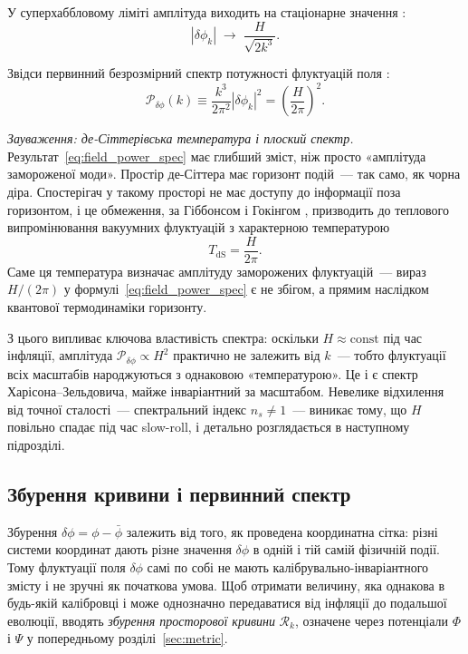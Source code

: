 \documentclass[12pt, a4paper]{article}
\begin{document}
У суперхаббловому ліміті амплітуда виходить на стаціонарне
значення \cite{guth_pi_1982}:
\begin{equation*}
  |\delta\phi_k| \;\to\; \frac{H}{\sqrt{2k^3}}.
\end{equation*}

Звідси первинний безрозмірний спектр потужності флуктуацій поля
\cite{mukhanov_chibisov_1981}:
\begin{equation}\label{eq:field_power_spec}
  \mathcal{P}_{\delta\phi}(k)
    \equiv \frac{k^3}{2\pi^2}|\delta\phi_k|^2
    = \left(\frac{H}{2\pi}\right)^{\!2}.
\end{equation}

\textit{Зауваження: де-Сіттерівська температура і плоский спектр.}
Результат~\eqref{eq:field_power_spec} має глибший зміст, ніж
просто «амплітуда замороженої моди». Простір де-Сіттера має
горизонт подій~--- так само, як чорна діра. Спостерігач у такому
просторі не має доступу до інформації поза горизонтом, і це
обмеження, за Гіббонсом і Гокінгом \cite{gibbons_hawking_1977},
призводить до теплового випромінювання вакуумних флуктуацій з
характерною температурою
\begin{equation*}
  T_\mathrm{dS} = \frac{H}{2\pi}.
\end{equation*}
Саме ця температура визначає амплітуду заморожених флуктуацій~---
вираз $H/(2\pi)$ у формулі~\eqref{eq:field_power_spec} є не
збігом, а прямим наслідком квантової термодинаміки горизонту.

З цього випливає ключова властивість спектра: оскільки $H \approx
\mathrm{const}$ під час інфляції, амплітуда $\mathcal{P}_{\delta\phi}
\propto H^2$ практично не залежить від $k$~--- тобто флуктуації
всіх масштабів народжуються з однаковою «температурою».
Це і є спектр Харісона--Зельдовича, майже інваріантний за
масштабом. Невелике відхилення від точної сталості~---
спектральний індекс $n_s \neq 1$~--- виникає тому, що $H$
повільно спадає під час slow-roll, і детально розглядається
в наступному підрозділі.

\subsection{Збурення кривини і первинний спектр}

Збурення $\delta\phi = \phi - \bar\phi$ залежить від того, як проведена
координатна сітка: різні системи координат дають різне значення $\delta\phi$
в одній і тій самій фізичній події.
Тому флуктуації поля $\delta\phi$ самі по собі не мають
калібрувально-інваріантного змісту і не зручні як початкова умова.
Щоб отримати величину, яка однакова в будь-якій калібровці і може
однозначно передаватися від інфляції до подальшої еволюції, вводять
\emph{збурення просторової кривини} $\mathcal{R}_k$, означене
через потенціали $\Phi$ і $\Psi$ у попередньому
розділі~\ref{sec:metric}.
\end{document}
